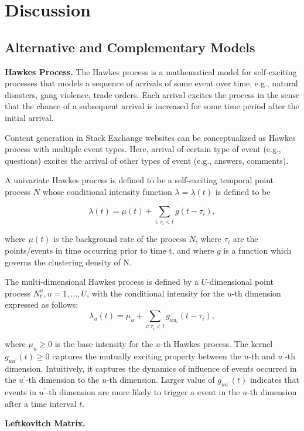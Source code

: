\section{Discussion}
\subsection{Alternative and Complementary Models}

\textbf{Hawkes Process.} The Hawkes process is a mathematical model for self-exciting processes that models a sequence of arrivals of some event over time, e.g., natural disasters, gang violence, trade orders.  Each arrival excites the process in the sense that the chance of a subsequent arrival is increased for some time period after the initial arrival. 

Content generation in Stack Exchange websites can be conceptualized as Hawkes process with multiple event types. Here, arrival of certain type of event (e.g., questions) excites the arrival of other types of event (e.g., answers, comments). 

A univariate Hawkes process is defined to be a self-exciting temporal point process $N$ whose conditional intensity function $\lambda = \lambda(t)$ is defined to be

 $$\lambda(t) = \mu(t)+\sum_{i:\tau_i<t}g(t-\tau_i),$$
 
where $\mu(t)$ is the background rate of the process  $N$, where $\tau_i$ are the points/events in time occurring prior to time t, and where $g$ is a function which governs the clustering density of N. 

The multi-dimensional Hawkes process is defined by a $U$-dimensional point process $N_t^u, u =1, . . . , U$, with the conditional intensity for the $u$-th dimension expressed as follows:
$$\lambda_u(t) = \mu_u + \sum_{i:\tau_i<t} g_{uu_i}(t-\tau_i),$$

where $\mu_u \ge 0$ is the base intensity for the $u$-th Hawkes process. The kernel $g_{uu^\prime}(t) \ge 0$ captures the mutually exciting property between the $u$-th and $u^\prime$-th dimension. Intuitively, it captures the dynamics of influence of events occurred in the $u^\prime$-th dimension to the $u$-th dimension. Larger value of $g_{uu^\prime}(t)$  indicates that events in $u^\prime$-th dimension are more likely to trigger a event in the $u$-th dimension after a time interval $t$.

\textbf{Leftkovitch Matrix.}

